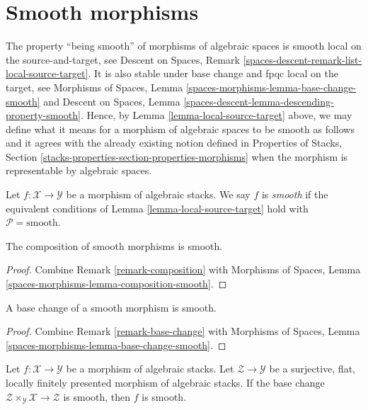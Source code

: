 






\section{Smooth morphisms}
\label{section-smooth}

\noindent
The property ``being smooth'' of morphisms of algebraic
spaces is smooth local on the source-and-target, see
Descent on Spaces, Remark \ref{spaces-descent-remark-list-local-source-target}.
It is also stable under base change and fpqc local on the target, see
Morphisms of Spaces,
Lemma \ref{spaces-morphisms-lemma-base-change-smooth}
and
Descent on Spaces, Lemma
\ref{spaces-descent-lemma-descending-property-smooth}.
Hence, by
Lemma \ref{lemma-local-source-target}
above, we may define what it means for a morphism of algebraic spaces
to be smooth as follows and it agrees with the already
existing notion defined in
Properties of Stacks,
Section \ref{stacks-properties-section-properties-morphisms}
when the morphism is representable by algebraic spaces.

\begin{definition}
\label{definition-smooth}
Let $f : \mathcal{X} \to \mathcal{Y}$ be a morphism of algebraic stacks.
We say $f$ is {\it smooth} if the equivalent conditions of
Lemma \ref{lemma-local-source-target}
hold with $\mathcal{P} = \text{smooth}$.
\end{definition}

\begin{lemma}
\label{lemma-composition-smooth}
The composition of smooth morphisms is smooth.
\end{lemma}

\begin{proof}
Combine
Remark \ref{remark-composition}
with
Morphisms of Spaces, Lemma
\ref{spaces-morphisms-lemma-composition-smooth}.
\end{proof}

\begin{lemma}
\label{lemma-base-change-smooth}
A base change of a smooth morphism is smooth.
\end{lemma}

\begin{proof}
Combine
Remark \ref{remark-base-change}
with
Morphisms of Spaces, Lemma
\ref{spaces-morphisms-lemma-base-change-smooth}.
\end{proof}

\begin{lemma}
\label{lemma-descent-smooth}
Let $f : \mathcal{X} \to \mathcal{Y}$ be a morphism of algebraic stacks.
Let $\mathcal{Z} \to \mathcal{Y}$ be a surjective, flat, locally finitely
presented morphism of algebraic stacks. If the base change
$\mathcal{Z} \times_\mathcal{Y} \mathcal{X} \to \mathcal{Z}$
is smooth, then $f$ is smooth.
\end{lemma}

